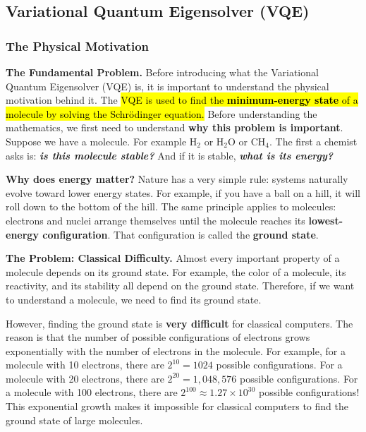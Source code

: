 \subsection{Variational Quantum Eigensolver (VQE)}\label{sec:variational-quantum-eigensolver-vqe}

\subsubsection{The Physical Motivation}\label{sec:the-physical-motivation}

\textcolor{Red2}{ \textbf{The Fundamental Problem.}} Before introducing what the Variational Quantum Eigensolver (VQE) is, it is important to understand the physical motivation behind it. The \hl{VQE is used to find the \textbf{minimum-energy state} of a molecule by solving the Schrödinger equation.} Before understanding the mathematics, we first need to understand \textbf{why this problem is important}. Suppose we have a molecule. For example $\mathrm{H}_{2}$ or $\mathrm{H}_{2}\mathrm{O}$ or $\mathrm{CH}_{4}$. The first a chemist asks is: \emph{\textbf{is this molecule stable?}} And if it is stable, \emph{\textbf{what is its energy?}}

\highspace
\textcolor{Green3}{ \textbf{Why does energy matter?}} Nature has a very simple rule: systems naturally evolve toward lower energy states. For example, if you have a ball on a hill, it will roll down to the bottom of the hill. The same principle applies to molecules: electrons and nuclei arrange themselves until the molecule reaches its \textbf{lowest-energy configuration}. That configuration is called the \textbf{ground state}.

\highspace
\textcolor{Red2}{ \textbf{The Problem: Classical Difficulty.}} Almost every important property of a molecule depends on its ground state. For example, the color of a molecule, its reactivity, and its stability all depend on the ground state. Therefore, if we want to understand a molecule, we need to find its ground state.

\highspace
However, finding the ground state is \textbf{very difficult} for classical computers. The reason is that the number of possible configurations of electrons grows exponentially with the number of electrons in the molecule. For example, for a molecule with 10 electrons, there are $2^{10} = 1024$ possible configurations. For a molecule with 20 electrons, there are $2^{20} = 1,048,576$ possible configurations. For a molecule with 100 electrons, there are $2^{100} \approx 1.27 \times 10^{30}$ possible configurations! This exponential growth makes it impossible for classical computers to find the ground state of large molecules.

